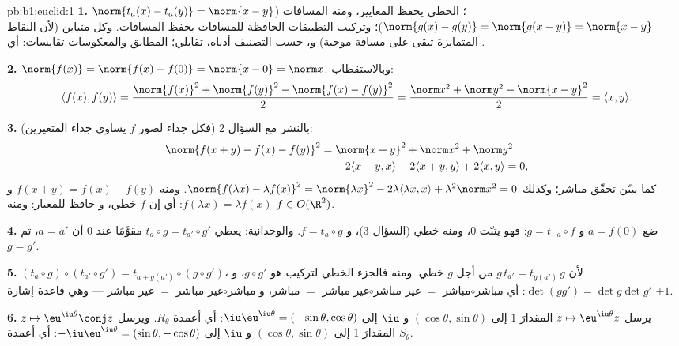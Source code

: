 \begin{solution}{pb:b1:euclid:1}
\textbf{1.} $\norm{t_a(x) - t_a(y)} = \norm{x - y}$؛ 
الخطي يحفظ المعايير، ومنه المسافات ($\norm{g(x) - g(y)} =
\norm{g(x - y)} = \norm{x-y}$)؛ وتركيب
التطبيقات الحافظة للمسافات يحفظ المسافات. وكل 
متباين (لأن النقاط المتمايزة تبقى على مسافة موجبة) و، حسب
التصنيف أدناه، تقابلي؛  المطابق والمعكوسات
تقايسات: أي .

\textbf{2.} $\norm{f(x)} = \norm{f(x) - f(0)} = \norm{x - 0} =
\norm x$. وبالاستقطاب:
\[
\langle f(x), f(y)\rangle
= \frac{\norm{f(x)}^2 + \norm{f(y)}^2 - \norm{f(x) -
f(y)}^2}{2}
= \frac{\norm x^2 + \norm y^2 - \norm{x - y}^2}{2}
= \langle x, y\rangle .
\]

\textbf{3.} بالنشر مع السؤال 2 (فكل جداء لصور $f$
يساوي جداء المتغيرين):
\begin{align*}
\norm{f(x+y) - f(x) - f(y)}^2
&= \norm{x+y}^2 + \norm x^2 + \norm y^2\\
&\quad - 2\langle x+y, x\rangle - 2\langle x+y, y\rangle
+ 2\langle x, y\rangle = 0 ,
\end{align*}
كما يبيّن تحقّق مباشر؛ وكذلك $\norm{f(\lambda x) -
\lambda f(x)}^2 = \norm{\lambda x}^2 - 2\lambda\langle \lambda
x, x\rangle + \lambda^2\norm x^2 = 0$. ومنه $f(x + y) = f(x) +
f(y)$ و $f(\lambda x) = \lambda f(x)$: أي إن $f$ خطي، و
حافظ للمعيار: ومنه $f \in O(\R^2)$.

\textbf{4.} ضع $a = f(0)$ و $g = t_{-a}\circ f$: فهو 
يثبّت $0$، ومنه  خطي (السؤال 3)، و $f = t_a
\circ g$. والوحدانية: يعطي $t_a \circ g = t_{a'}\circ g'$ مقوَّمًا
عند $0$ أن $a = a'$، ثم $g = g'$.

\textbf{5.} $(t_a\circ g)\circ(t_{a'}\circ g') = t_{a +
g(a')}\circ(g\circ g')$، لأن $g\,t_{a'} = t_{g(a')}\,g$ من أجل
$g$ خطي. ومنه فالجزء الخطي لتركيب هو $g \circ g'$،
و $\det(gg') = \det g \det g'$: أي مباشر$\circ$مباشر $=$
غير مباشر$\circ$غير مباشر $=$ مباشر، و
مباشر$\circ$غير مباشر $=$ غير مباشر --- وهي قاعدة إشارة $\pm1$.

\textbf{6.} يرسل $z \mapsto \eu^{\iu\theta}z$ المقدارَ $1$ إلى
$(\cos\theta, \sin\theta)$ و $\iu$ إلى
$\iu\eu^{\iu\theta} = (-\sin\theta, \cos\theta)$: أي أعمدة
$R_\theta$. ويرسل $z \mapsto \eu^{\iu\theta}\conj z$ المقدارَ $1$ إلى
$(\cos\theta, \sin\theta)$ و $\iu$ إلى $-\iu\eu^{\iu\theta} =
(\sin\theta, -\cos\theta)$: أي أعمدة $S_\theta$.


\end{solution}
